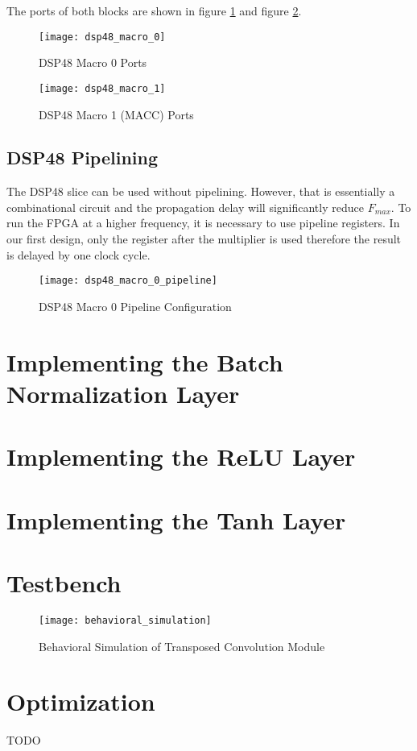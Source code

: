The ports of both blocks are shown in figure \ref{fig:dsp48_macro_0} and figure \ref{fig:dsp48_macro_1}.

\begin{figure}[h]
  \centering
  \texttt{[image: dsp48\_macro\_0]}
  \caption{DSP48 Macro 0 Ports}
  \label{fig:dsp48_macro_0}
\end{figure}

\begin{figure}[h]
  \centering
  \texttt{[image: dsp48\_macro\_1]}
  \caption{DSP48 Macro 1 (MACC) Ports}
  \label{fig:dsp48_macro_1}
\end{figure}

\subsection{DSP48 Pipelining}

The DSP48 slice can be used without pipelining. However, that is essentially a combinational circuit and
the propagation delay will significantly reduce $F_{max}$. To run the FPGA at a higher frequency, it is
necessary to use pipeline registers. In our first design, only the register after the multiplier is used
therefore the result is delayed by one clock cycle.

\begin{figure}[h]
  \centering
  \texttt{[image: dsp48\_macro\_0\_pipeline]}
  \caption{DSP48 Macro 0 Pipeline Configuration}
  \label{fig:dsp48_macro_0_pipeline}
\end{figure}

\section{Implementing the Batch Normalization Layer}
\section{Implementing the ReLU Layer}
\section{Implementing the Tanh Layer}

\section{Testbench}

\begin{figure}[h]
  \centering
  \texttt{[image: behavioral\_simulation]}
  \caption{Behavioral Simulation of Transposed Convolution Module}
  \label{fig:behavioral_simulation}
\end{figure}

\section{Optimization}

TODO

\clearpage %
